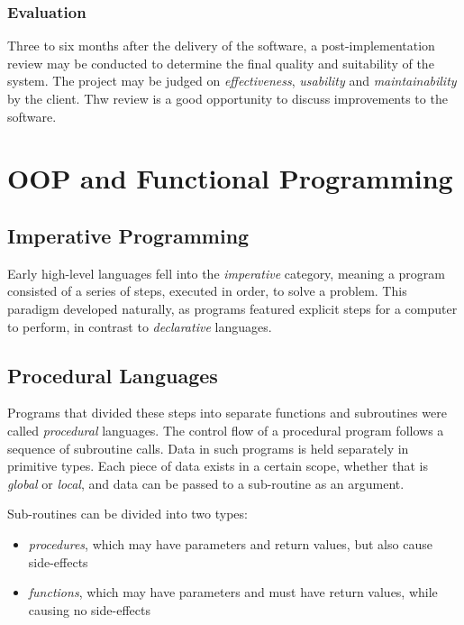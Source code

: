 \documentclass[10pt]{article}
\let\oldsection\section
\renewcommand\section{\clearpage\oldsection}
\begin{document}
\subsubsection{Evaluation}
\label{sec:orgccf13d8}

Three to six months after the delivery of the software, a post-implementation review may be conducted to determine the final quality and suitability of the system. The project may be judged on \emph{effectiveness}, \emph{usability} and \emph{maintainability} by the client. Thw review is a good opportunity to discuss improvements to the software.

\section{OOP and Functional Programming}
\label{sec:org83ec2c3}
\subsection{Imperative Programming}
\label{sec:org45cfc23}

Early high-level languages fell into the \emph{imperative} category, meaning a program consisted of a series of steps, executed in order, to solve a problem. This paradigm developed naturally, as programs featured explicit steps for a computer to perform, in contrast to \emph{declarative} languages.

\subsection{Procedural Languages}
\label{sec:org06a8d17}

Programs that divided these steps into separate functions and subroutines were called \emph{procedural} languages. The control flow of a procedural program follows a sequence of subroutine calls. Data in such programs is held separately in primitive types. Each piece of data exists in a certain scope, whether that is \emph{global} or \emph{local}, and data can be passed to a sub-routine as an argument.

Sub-routines can be divided into two types:

\begin{itemize}
\item \emph{procedures}, which may have parameters and return values, but also cause side-effects
\item \emph{functions}, which may have parameters and must have return values, while causing no side-effects
\end{itemize}
\end{document}
